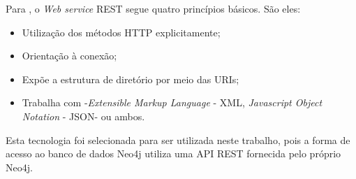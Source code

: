 
Para , o \textit{Web service} REST segue quatro princípios básicos. São eles: 

\begin{itemize}
	\item Utilização dos métodos HTTP explicitamente;
	\item Orientação à conexão;
	\item Expõe a estrutura de diretório por meio das URIs;
	\item Trabalha com -\textit{Extensible Markup Language} - XML\footnotemark[24], \textit{Javascript Object Notation} - JSON\footnotemark[25] - ou ambos.
\end{itemize}



Esta tecnologia foi selecionada para ser utilizada neste trabalho, pois a forma de acesso ao banco de dados Neo4j utiliza uma API REST fornecida pelo próprio Neo4j.